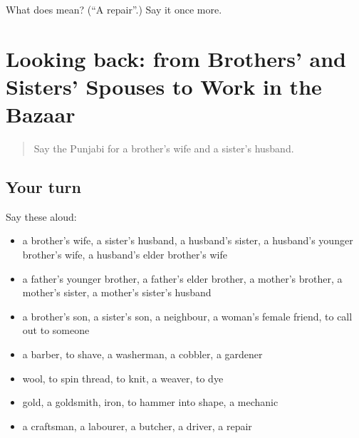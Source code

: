 \begin{tcolorbox}[breakable,colback=teal!4,colframe=teal!35!black,title={Before you move on}]
What does  mean? (\textquotedblleft{}A repair\textquotedblright{}.) Say it once more.
\end{tcolorbox}
\section[(dialogue)]{Looking back: from Brothers' and Sisters' Spouses to Work in the Bazaar}

\label{lesson:PA-R336-review-330-336}



\begin{quote}
Say the Punjabi for a brother's wife and a sister's husband.
\end{quote}

\subsection*{Your turn}
Say these aloud:

\begin{itemize}
\raggedright
  \item a brother's wife, a sister's husband, a husband's sister, a husband's younger brother's wife, a husband's elder brother's wife
  \item a father's younger brother, a father's elder brother, a mother's brother, a mother's sister, a mother's sister's husband
  \item a brother's son, a sister's son, a neighbour, a woman's female friend, to call out to someone
  \item a barber, to shave, a washerman, a cobbler, a gardener
  \item wool, to spin thread, to knit, a weaver, to dye
  \item gold, a goldsmith, iron, to hammer into shape, a mechanic
  \item a craftsman, a labourer, a butcher, a driver, a repair
\end{itemize}

